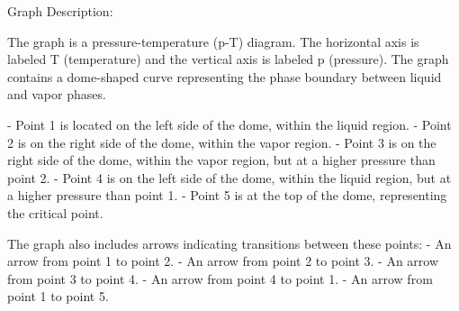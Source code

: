 Graph Description:

The graph is a pressure-temperature (p-T) diagram. The horizontal axis is labeled T (temperature) and the vertical axis is labeled p (pressure). The graph contains a dome-shaped curve representing the phase boundary between liquid and vapor phases.

- Point 1 is located on the left side of the dome, within the liquid region.
- Point 2 is on the right side of the dome, within the vapor region.
- Point 3 is on the right side of the dome, within the vapor region, but at a higher pressure than point 2.
- Point 4 is on the left side of the dome, within the liquid region, but at a higher pressure than point 1.
- Point 5 is at the top of the dome, representing the critical point.

The graph also includes arrows indicating transitions between these points:
- An arrow from point 1 to point 2.
- An arrow from point 2 to point 3.
- An arrow from point 3 to point 4.
- An arrow from point 4 to point 1.
- An arrow from point 1 to point 5.
